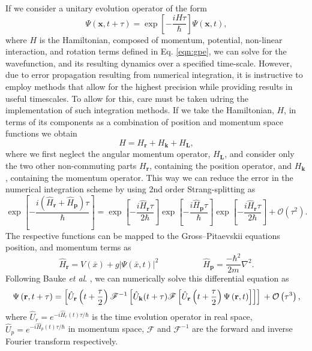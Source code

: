 If we consider a unitary evolution operator of the form
\begin{equation}\label{eqn:1}
\Psi(\mathbf{x},t+\tau) = \exp\left[ -\frac{iH\tau}{\hbar}\right]\Psi(\mathbf{x},t),
\end{equation}
where $H$ is the Hamiltonian, composed of momentum, potential, non-linear interaction, and rotation terms defined in Eq. \eqref{eqn:gpe}, we can solve for the wavefunction, and its resulting dynamics over a specified time-scale. However, due to error propagation resulting from numerical integration, it is instructive to employ methods that allow for the highest precision while providing results in useful timescales. To allow for this, care must be taken udring the implementation of such integration methods.  If we take the Hamiltonian, $H$, in terms of its components as a combination of position and momentum space functions we obtain
\begin{equation}\label{eqn:2}
{H} = {H}_{\textbf{r}} + {H}_{\textbf{k}} + {H}_{\textbf{L}},
\end{equation}
where we first neglect the angular momentum operator, ${H}_{\textbf{L}}$, and consider only the two other non-commuting parts ${H}_{\textbf{r}}$, containing the position operator, and ${H}_{\textbf{k}}$, containing the momentum operator. This way we can reduce the error in the numerical integration scheme by using 2nd order Strang-splitting as
\begin{equation}\label{eqn:3}
\exp\left[ -\frac{ i\left(\hat{H}_{\textbf{r}} + \hat{H}_{\textbf{p}}\right)\tau}{\hbar} \right] = \exp\left[- \frac{i\hat{H}_{\textbf{r}}\tau}{2\hbar} \right]\exp\left[-\frac{i\hat{H}_{\textbf{p}}\tau}{\hbar}\right]\exp\left[ -\frac{i\hat{H}_{\textbf{r}}\tau}{2\hbar}\right] + \mathcal{O}\left(\tau^2\right).
\end{equation}
The respective functions can be mapped to the Gross--Pitaevskii equations position, and momentum terms as
\begin{equation}
\hat{H}_{\textbf{r}} = V(\bar{x}) + g\vert\Psi(\bar{x},t)\vert^2\; \hspace{5em} \hat{H}_{\textbf{p}} = \frac{-\hbar^2}{2m}\nabla^2.
\end{equation}
Following Bauke \textit{et al}. \cite{Num:Bauke_cpc_2011}, we can numerically solve this differential equation as
\begin{equation}
\Psi\left(\textbf{r},t+\tau\right) = \left[\hat{U}_{\mathbf{r}}\left(t+\frac{\tau}{2}\right) \mathscr{F}^{-1} \left[ \hat{U}_{\mathbf{k}}(t+\tau) \mathscr{F} \left[ \hat{U}_{\mathbf{r}}\left(t+\frac{\tau}{2}\right) \Psi\left(\mathbf{r},t\right) \right] \right] \right]  \\ + \mathcal{O}\left(\tau^3\right),
\end{equation}
where $\hat{U}_{r}=e^{-i\hat{H}_{r}(t)\tau/\hbar}$ is the time evolution operator in real space, $\hat{U}_{p}=e^{-i\hat{H}_{p}(t)\tau/\hbar}$ in momentum space,  $\mathscr{F}$ and $\mathscr{F}^{-1}$ are the forward and inverse Fourier transform respectively.

